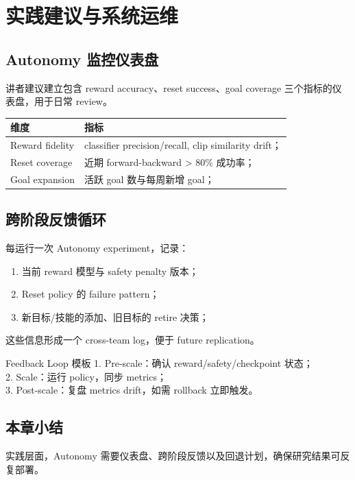 \section{实践建议与系统运维}
\subsection{Autonomy 监控仪表盘}
讲者建议建立包含 reward accuracy、reset success、goal coverage 三个指标的仪表盘，用于日常 review。
\begin{tabularx}{\textwidth}{lX}
\toprule
维度 & 指标 \\
\midrule
Reward fidelity & classifier precision/recall, clip similarity drift； \\
Reset coverage & 近期 forward-backward > 80\% 成功率； \\
Goal expansion & 活跃 goal 数与每周新增 goal； \\
\bottomrule
\end{tabularx}

\subsection{跨阶段反馈循环}
每运行一次 Autonomy experiment，记录：
\begin{enumerate}
\item 当前 reward 模型与 safety penalty 版本；
\item Reset policy 的 failure pattern；
\item 新目标/技能的添加、旧目标的 retire 决策；
\end{enumerate}
这些信息形成一个 cross-team log，便于 future replication。

\begin{knowledgebox}{Feedback Loop 模板}
1. Pre-scale：确认 reward/safety/checkpoint 状态；\\
2. Scale：运行 policy，同步 metrics；\\
3. Post-scale：复盘 metrics drift，如需 rollback 立即触发。
\end{knowledgebox}

\subsection{本章小结}
实践层面，Autonomy 需要仪表盘、跨阶段反馈以及回退计划，确保研究结果可反复部署。
\newpage

